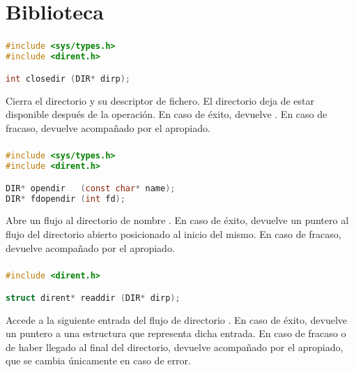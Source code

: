\chapter{Biblioteca }

\subsection{}\label{closedir}

\begin{lstlisting}[language=C]
#include <sys/types.h>
#include <dirent.h>

int closedir (DIR* dirp);
\end{lstlisting}

Cierra el directorio  y su descriptor de fichero.
El directorio deja de estar disponible después de la operación.
En caso de éxito, devuelve .
En caso de fracaso, devuelve  acompañado por el  apropiado.

\subsection{}\label{opendir}

\begin{lstlisting}[language=C]
#include <sys/types.h>
#include <dirent.h>

DIR* opendir   (const char* name);
DIR* fdopendir (int fd);
\end{lstlisting}

Abre un flujo al directorio de nombre .
En caso de éxito, devuelve un puntero al flujo del directorio abierto posicionado al inicio del mismo.
En caso de fracaso, devuelve  acompañado por el  apropiado.

\subsection{}\label{readdir}

\begin{lstlisting}[language=C]
#include <dirent.h>

struct dirent* readdir (DIR* dirp);
\end{lstlisting}

Accede a la siguiente entrada del flujo de directorio .
En caso de éxito, devuelve un puntero a una estructura  que representa dicha entrada.
En caso de fracaso o de haber llegado al final del directorio, devuelve  acompañado por el  apropiado, que se cambia únicamente en caso de error.

